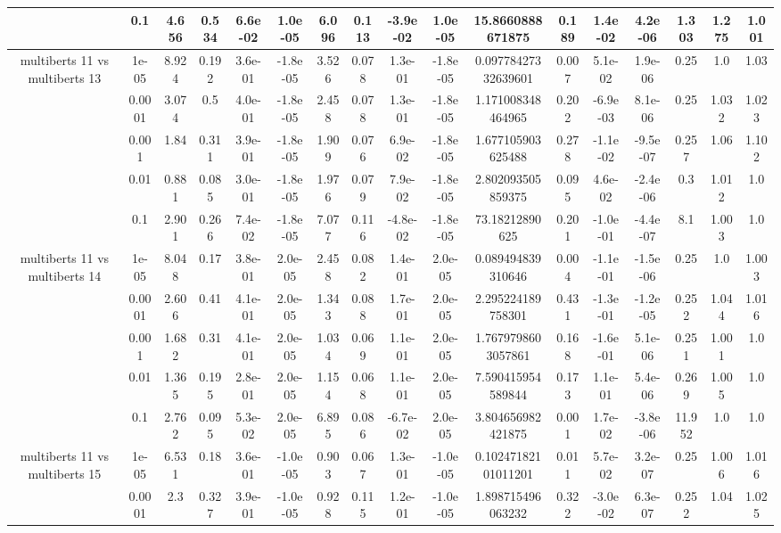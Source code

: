 \begin{tabular}{|c|c|c|c|c|c|c|c|c|c|c|c|c|c|c|c|c|}
 & 0.1 & 4.656 & 0.534 & 6.6e-02 & 1.0e-05 & 6.096 & 0.113 & -3.9e-02 & 1.0e-05 & 15.8660888671875 & 0.189 & 1.4e-02 & 4.2e-06 & 1.303 & 1.275 & 1.001 \\
\hline
\multirow{5}{*}{multiberts 11 vs multiberts 13} & 1e-05 & 8.924 & 0.192 & 3.6e-01 & -1.8e-05 & 3.526 & 0.078 & 1.3e-01 & -1.8e-05 & 0.09778427332639601 & 0.007 & 5.1e-02 & 1.9e-06 & 0.25 & 1.0 & 1.03 \\
 & 0.0001 & 3.074 & 0.5 & 4.0e-01 & -1.8e-05 & 2.458 & 0.078 & 1.3e-01 & -1.8e-05 & 1.171008348464965 & 0.202 & -6.9e-03 & 8.1e-06 & 0.25 & 1.032 & 1.023 \\
 & 0.001 & 1.84 & 0.311 & 3.9e-01 & -1.8e-05 & 1.909 & 0.076 & 6.9e-02 & -1.8e-05 & 1.677105903625488 & 0.278 & -1.1e-02 & -9.5e-07 & 0.257 & 1.06 & 1.102 \\
 & 0.01 & 0.881 & 0.085 & 3.0e-01 & -1.8e-05 & 1.976 & 0.079 & 7.9e-02 & -1.8e-05 & 2.802093505859375 & 0.095 & 4.6e-02 & -2.4e-06 & 0.3 & 1.012 & 1.0 \\
 & 0.1 & 2.901 & 0.266 & 7.4e-02 & -1.8e-05 & 7.077 & 0.116 & -4.8e-02 & -1.8e-05 & 73.18212890625 & 0.201 & -1.0e-01 & -4.4e-07 & 8.1 & 1.003 & 1.0 \\
\hline
\multirow{5}{*}{multiberts 11 vs multiberts 14} & 1e-05 & 8.048 & 0.17 & 3.8e-01 & 2.0e-05 & 2.458 & 0.082 & 1.4e-01 & 2.0e-05 & 0.089494839310646 & 0.004 & -1.1e-01 & -1.5e-06 & 0.25 & 1.0 & 1.003 \\
 & 0.0001 & 2.606 & 0.41 & 4.1e-01 & 2.0e-05 & 1.343 & 0.088 & 1.7e-01 & 2.0e-05 & 2.295224189758301 & 0.431 & -1.3e-01 & -1.2e-05 & 0.252 & 1.044 & 1.016 \\
 & 0.001 & 1.682 & 0.31 & 4.1e-01 & 2.0e-05 & 1.034 & 0.069 & 1.1e-01 & 2.0e-05 & 1.7679798603057861 & 0.168 & -1.6e-01 & 5.1e-06 & 0.251 & 1.001 & 1.0 \\
 & 0.01 & 1.365 & 0.195 & 2.8e-01 & 2.0e-05 & 1.154 & 0.068 & 1.1e-01 & 2.0e-05 & 7.590415954589844 & 0.173 & 1.1e-01 & 5.4e-06 & 0.269 & 1.005 & 1.0 \\
 & 0.1 & 2.762 & 0.095 & 5.3e-02 & 2.0e-05 & 6.895 & 0.086 & -6.7e-02 & 2.0e-05 & 3.804656982421875 & 0.001 & 1.7e-02 & -3.8e-06 & 11.952 & 1.0 & 1.0 \\
\hline
\multirow{5}{*}{multiberts 11 vs multiberts 15} & 1e-05 & 6.531 & 0.18 & 3.6e-01 & -1.0e-05 & 0.903 & 0.067 & 1.3e-01 & -1.0e-05 & 0.10247182101011201 & 0.011 & 5.7e-02 & 3.2e-07 & 0.25 & 1.006 & 1.016 \\
 & 0.0001 & 2.3 & 0.327 & 3.9e-01 & -1.0e-05 & 0.928 & 0.115 & 1.2e-01 & -1.0e-05 & 1.898715496063232 & 0.322 & -3.0e-02 & 6.3e-07 & 0.252 & 1.04 & 1.025 \\

\end{tabular}

